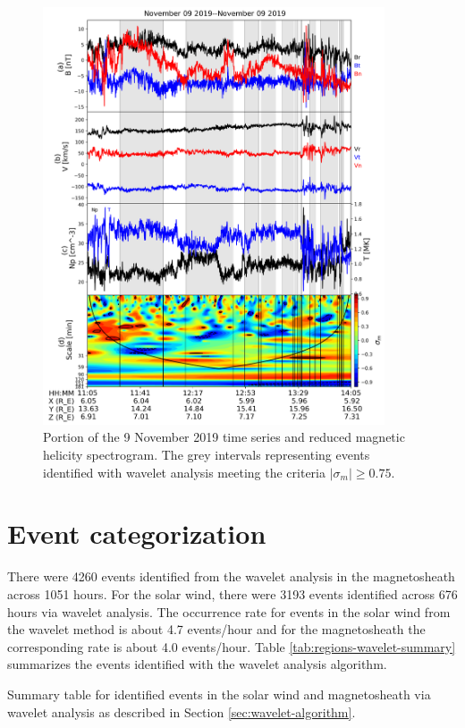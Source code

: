 \begin{figure}
    \centering
    \includegraphics[width=0.9\textwidth]{Figures/Spectrograms/spectrogram_events_09112019_1105.png}
    \caption[Time series and spectrogram for 9 November 2019 with identified events overlaid]{Portion of the 9 November 2019 time series and reduced magnetic helicity spectrogram. The grey intervals representing events identified with wavelet analysis meeting the criteria $|\sigma_m|\geq 0.75$.}
    \label{fig:wavelet-spectrograms-interval}
\end{figure}


\section{Event categorization}\label{sec:wavelet-results}
There were 4260 events identified from the wavelet analysis in the magnetosheath across 1051 hours. For the solar wind, there were 3193 events identified across 676 hours via wavelet analysis. The occurrence rate for events in the solar wind from the wavelet method is about 4.7 events/hour and for the magnetosheath the corresponding rate is about 4.0 events/hour. Table  \ref{tab:regions-wavelet-summary} summarizes the events identified with the wavelet analysis algorithm.
\begin{table}
    \centering
    \caption{Summary table for identified events in the solar wind and magnetosheath via wavelet analysis as described in Section \ref{sec:wavelet-algorithm}.}
    
    \label{tab:regions-wavelet-summary}
\end{table}

